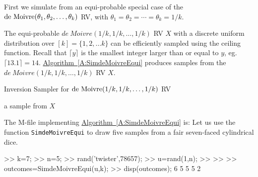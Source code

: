 First we simulate from an equi-probable special case of the $\mbox{{\rm de~Moivre}}(\theta_1,\theta_2,\ldots,\theta_k)$ RV, with $\theta_1=\theta_2=\cdots=\theta_k=1/k$.
\begin{simulation}\label{SIM:deMoivreEqui}
The equi-probable $de~Moivre(1/k,1/k,\ldots,1/k)$ RV $X$ with a discrete uniform distribution over $[k] = \{1,2,\ldots k\}$ can be efficiently sampled using the ceiling function.  Recall that $\lceil y \rceil$ is the smallest integer larger than or equal to $y$, eg.~$\lceil 13.1 \rceil = 14$.  \hyperref[A:SimdeMoivreEqui]{Algorithm~\ref*{A:SimdeMoivreEqui}} produces samples from the $de~Moivre(1/k,1/k,\ldots,1/k)$ RV $X$.

\begin{algorithm}[h]
\caption{ Inversion Sampler  for $\mbox{{\rm de~Moivre}}(1/k,1/k,\ldots,1/k)$ RV}
\label{A:SimdeMoivreEqui}
\begin{algorithmic}[1]
 a sample from $X$
\end{algorithmic}
\end{algorithm}

The M-file implementing \hyperref[A:SimdeMoivreEqui]{Algorithm~\ref*{A:SimdeMoivreEqui}} is:
Let us use the function {\tt SimdeMoivreEqui} to draw five samples from a fair seven-faced cylindrical dice.
\begin{VrbM}
>> k=7; %
>> n=5; %
>> rand('twister',78657); %
>> u=rand(1,n); %
>> %
>> %
>> outcomes=SimdeMoivreEqui(u,k); %
>> disp(outcomes);
     6     5     5     5     2
\end{VrbM}
\end{simulation}

